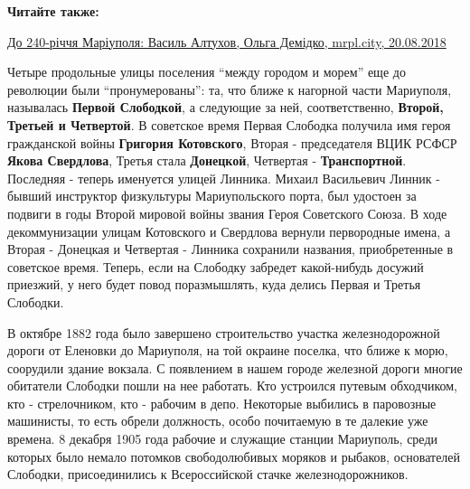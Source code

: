 
\vspace{0.5cm}
\begin{minipage}{0.9\textwidth}
\textbf{Читайте также:}

\href{https://mrpl.city/blogs/view/vasil-altuhov}{%
До 240-річчя Маріуполя: Василь Алтухов, Ольга Демідко, mrpl.city, 20.08.2018}
\end{minipage}
\vspace{0.5cm}

Четыре продольные улицы поселения \enquote{между городом и морем} еще до революции были
\enquote{пронумерованы}: та, что ближе к нагорной части Мариуполя, называлась \textbf{Первой
Слободкой}, а следующие за ней, соответственно, \textbf{Второй, Третьей и Четвертой}. В
советское время Первая Слободка получила имя героя гражданской войны \textbf{Григория
Котовского}, Вторая - председателя ВЦИК РСФСР \textbf{Якова Свердлова}, Третья стала
\textbf{Донецкой}, Четвертая - \textbf{Транспортной}. Последняя - теперь именуется улицей
Линника. Михаил Васильевич Линник - бывший инструктор физкультуры
Мариупольского порта, был удостоен за подвиги в годы Второй мировой войны
звания Героя Советского Союза. В ходе декоммунизации улицам Котовского и
Свердлова вернули первородные имена, а Вторая - Донецкая и Четвертая - Линника
сохранили названия, приобретенные в советское время. Теперь, если на Слободку
забредет какой-нибудь досужий приезжий, у него будет повод поразмышлять, куда
делись Первая и Третья Слободки.


В октябре 1882 года было завершено строительство участка железнодорожной дороги
от Еленовки до Мариуполя, на той окраине поселка, что ближе к морю, соорудили
здание вокзала. С появлением в нашем городе железной дороги многие обитатели
Слободки пошли на нее работать. Кто устроился путевым обходчиком, кто -
стрелочником, кто - рабочим в депо. Некоторые выбились в паровозные машинисты,
то есть обрели должность, особо почитаемую в те далекие уже времена. 8 декабря
1905 года рабочие и служащие станции Мариуполь, среди которых было немало
потомков свободолюбивых моряков и рыбаков, основателей Слободки, присоединились
к Всероссийской стачке железнодорожников.

